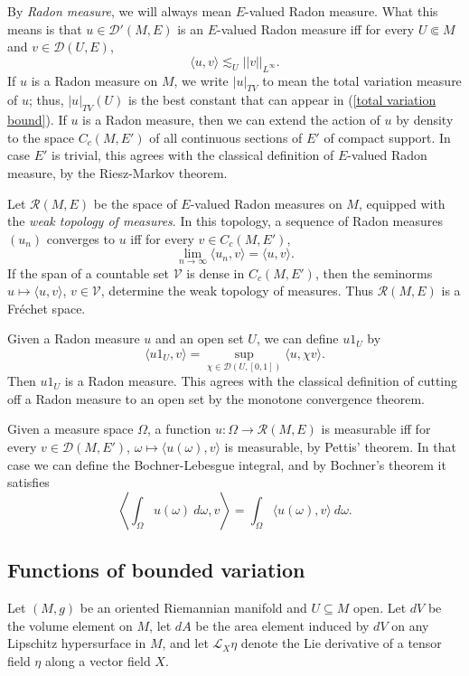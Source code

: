 \documentclass[reqno,12pt,letterpaper]{amsart}
\newcommand{\dfn}[1]{\emph{#1}\index{#1}}
\theoremstyle{definition}
\numberwithin{equation}{section}
\begin{document}
By \dfn{Radon measure}, we will always mean $E$-valued Radon measure.
What this means is that $u \in \mathcal D'(M, E)$ is an $E$-valued Radon measure iff for every $U \Subset M$ and $v \in \mathcal D(U, E)$,
\begin{equation}
\label{total variation bound}
\langle u, v\rangle \lesssim_U ||v||_{L^\infty}.
\end{equation}
If $u$ is a Radon measure on $M$, we write $|u|_{TV}$ to mean the total variation measure of $u$; thus, $|u|_{TV}(U)$ is the best constant that can appear in (\ref{total variation bound}).
If $u$ is a Radon measure, then we can extend the action of $u$ by density to the space $C_c(M, E')$ of all continuous sections of $E'$ of compact support.
In case $E'$ is trivial, this agrees with the classical definition of $E$-valued Radon measure, by the Riesz-Markov theorem.

Let $\mathcal R(M, E)$ be the space of $E$-valued Radon measures on $M$, equipped with the \dfn{weak topology of measures}.
In this topology, a sequence of Radon measures $(u_n)$ converges to $u$ iff for every $v \in C_c(M, E')$,
$$\lim_{n \to \infty} \langle u_n, v\rangle = \langle u, v\rangle.$$
If the span of a countable set $\mathcal V$ is dense in $C_c(M, E')$, then the seminorms $u \mapsto \langle u, v\rangle$, $v \in \mathcal V$, determine the weak topology of measures.
Thus $\mathcal R(M, E)$ is a Fr\'echet space.

Given a Radon measure $u$ and an open set $U$, we can define $u1_U$ by
$$\langle u1_U, v\rangle = \sup_{\chi \in \mathcal D(U, [0, 1])} \langle u, \chi v\rangle.$$
Then $u1_U$ is a Radon measure.
This agrees with the classical definition of cutting off a Radon measure to an open set by the monotone convergence theorem.

Given a measure space $\Omega$, a function $u: \Omega \to \mathcal R(M, E)$ is measurable iff for every $v \in \mathcal D(M, E')$, $\omega \mapsto \langle u(\omega), v\rangle$ is measurable, by Pettis' theorem.
In that case we can define the Bochner-Lebesgue integral, and by Bochner's theorem it satisfies
$$\left\langle\int_\Omega u(\omega) ~d\omega, v\right\rangle = \int_\Omega \langle u(\omega), v\rangle ~d\omega.$$

\subsection{Functions of bounded variation}
Let $(M, g)$ be an oriented Riemannian manifold and $U \subseteq M$ open.
Let $dV$ be the volume element on $M$, let $dA$ be the area element induced by $dV$ on any Lipschitz hypersurface in $M$, and let $\mathcal L_X\eta$ denote the Lie derivative of a tensor field $\eta$ along a vector field $X$.
\end{document}
